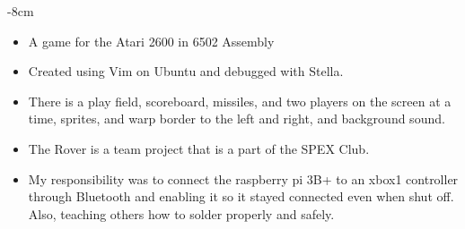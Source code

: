 \documentclass[10pt,a4paper]{altacv}
\begin{document}
\photo{6cm}{}

%

\begin{adjustwidth}{}{-8cm}
\makecvheader
\end{adjustwidth}

%








\begin{itemize}
  \item A game for the Atari 2600 in 6502 Assembly
  \item Created using Vim on Ubuntu and debugged with Stella.
  \item There is a play field, scoreboard, missiles, and two players on the screen at a time, sprites, and warp border to the left and right, and background sound.
  
\end{itemize}
\divider
%


\begin{itemize}
  \item The Rover is a team project that is a part of the SPEX Club.
  \item My responsibility was to connect the raspberry pi 3B+ to an xbox1 controller through Bluetooth and enabling it so it stayed connected even when shut off. Also, teaching others how to solder properly and safely.
  
\end{itemize}
\divider
%
\end{document}
